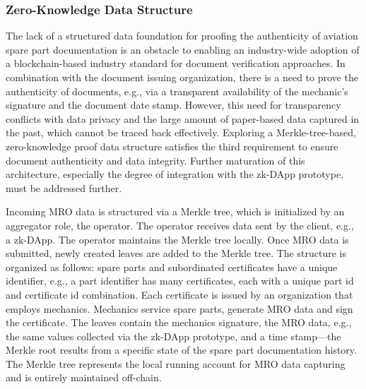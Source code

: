\subsubsection{Zero-Knowledge Data Structure}
The lack of a structured data foundation for proofing the authenticity of aviation spare part documentation is an obstacle to enabling an industry-wide adoption of a blockchain-based industry standard for document verification approaches. In combination with the document issuing organization, there is a need to prove the authenticity of documents, e.g., via a transparent availability of the mechanic's signature and the document date stamp. However, this need for transparency conflicts with data privacy and the large amount of paper-based data captured in the past, which cannot be traced back effectively. Exploring a Merkle-tree-based, zero-knowledge proof data structure satisfies the third requirement to ensure document authenticity and data integrity. Further maturation of this architecture, especially the degree of integration with the zk-DApp prototype, must be addressed further.

Incoming MRO data is structured via a Merkle tree, which is initialized by an aggregator role, the operator. The operator receives data sent by the client, e.g., a zk-DApp. The operator maintains the Merkle tree locally. Once MRO data is submitted, newly created leaves are added to the Merkle tree. The structure is organized as follows: spare parts and subordinated certificates have a unique identifier, e.g., a part identifier has many certificates, each with a unique part id and certificate id combination. Each certificate is issued by an organization that employs mechanics. Mechanics service spare parts, generate MRO data and sign the certificate. The leaves contain the mechanics signature, the MRO data, e.g., the same values collected via the zk-DApp prototype, and a time stamp—the Merkle root results from a specific state of the spare part documentation history. The Merkle tree represents the local running account for MRO data capturing and is entirely maintained off-chain. 

